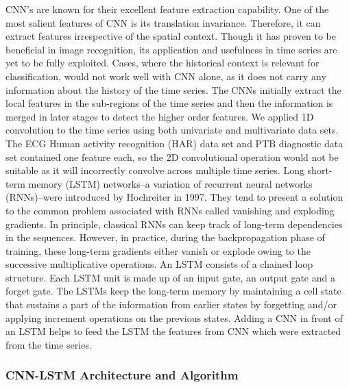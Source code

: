 \documentclass{ieeeaccess}
\begin{document}
CNN's are known for their excellent feature extraction capability. One of the most salient features of CNN is its translation invariance. Therefore, it can extract features irrespective of the spatial context. Though it has proven to be beneficial in image recognition, its application and usefulness in time series are yet to be fully exploited. Cases, where the historical context is relevant for classification, would not work well with CNN alone, as it does not carry any information about the history of the time series. The CNNs initially extract the local features in the sub-regions of the time series and then the information is merged in later stages to detect the higher order features. We applied 1D convolution to the time series using both univariate and multivariate data sets. The ECG Human activity recognition (HAR) data set and PTB diagnostic data set contained one feature each, so the 2D convolutional operation would not be suitable as it will incorrectly convolve across multiple time series. 
Long short-term memory (LSTM) networks--a variation of recurrent neural networks (RNNs)--were introduced by Hochreiter \cite{LSTM} in 1997. They tend to present a solution to the common problem associated with RNNs called vanishing and exploding gradients. In principle, classical RNNs can keep track of long-term dependencies in the sequences. However, in practice, during the backpropagation phase of training, these long-term gradients either vanish or explode owing to the successive multiplicative operations. An LSTM consists of a chained loop structure. Each LSTM unit is made up of an input gate, an output gate and a forget gate. The LSTMs keep the long-term memory by maintaining a cell state that sustains a part of the information from earlier states by forgetting and/or applying increment operations on the previous states. Adding a CNN in front of an LSTM helps to feed the LSTM the features from CNN which were extracted from the time series.
\subsubsection{CNN-LSTM Architecture and Algorithm}
\end{document}
